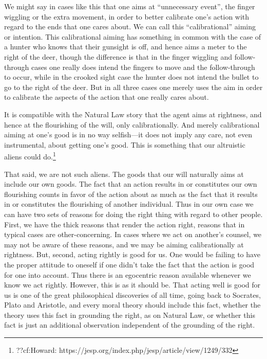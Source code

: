 We might say in cases like this that one aims at ``unnecessary event'', the finger wiggling or the extra movement, in order to 
better calibrate one's action with regard to the ends that one cares about. We can call this ``calibrational'' aiming or
intention. This calibrational aiming has something in common with the case of a hunter who knows that their gunsight is off,
and hence aims a meter to the right of the deer, though the difference is that in the finger wiggling and follow-through
cases one really does intend the fingers to move and the follow-through to occur, while in the crooked sight case the hunter does
not intend the bullet to go to the right of the deer. But in all three cases one merely uses the aim in order to calibrate the 
aspects of the action that one really cares about. 

It is compatible with the Natural Law story that the agent aims at rightness, and hence at the flourishing of the will, only
calibrationally. And merely calibrational aiming at one's good is in no way selfish---it does not imply any care, not even instrumental,
about getting one's good. This is something that our altruistic aliens could do.\footnote{??cf:Howard: https://jesp.org/index.php/jesp/article/view/1249/332}

That said, we are not such aliens. The goods that our will naturally aims at include our own goods. The fact that an action 
results in or constitutes our own flourishing counts in favor of the action about as much as the fact that it results in or constitutes the
flourishing of another individual. Thus in our own case we can have two sets of reasons for doing the right thing with regard to other
people. First, we have the thick reasons that render the action right, reasons that in typical cases are other-concerning. In cases where
we act on another's counsel, we may not be aware of these reasons, and we may be aiming calibrationally at rightness. But, second, acting
rightly is good for us. One would be failing to have the proper attitude to oneself if one didn't take the fact that the action is good
for one into account. Thus there is an egocentric reason available whenever we know we act rightly. However, this is as it should be.
That acting well is good for us is one of the great philosophical discoveries of all time, going back to Socrates, Plato and Aristotle,
and every moral theory should include this fact, whether the theory uses this fact in grounding the right, as on Natural Law, or whether
this fact is just an additional observation independent of the grounding of the right. 


\chaptertail 
